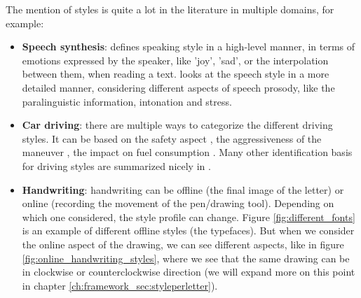   \par The mention of styles is quite a lot in the literature in multiple domains, for example:
  \begin{itemize}
    \item \textbf{Speech synthesis}: \citep{tachibana2004hmm} defines speaking style in a high-level manner, in terms of emotions expressed by the speaker, like 'joy', 'sad', or the interpolation between them, when reading a text. \citep{wang2018style} looks at the speech style in a more detailed manner, considering different aspects of speech prosody, like the paralinguistic information, intonation and stress.
    \item \textbf{Car driving}: there are multiple ways to categorize the different driving styles. It can be based on the safety aspect \citep{johnson2011driving}, the aggressiveness of the maneuver \citep{dorr2014online,xu2015establishing}, the impact on fuel consumption \citep{manzoni2010driving,neubauer2013accounting}. Many other identification basis for driving styles are summarized nicely in \citep{martinez2017driving}.
    \item \textbf{Handwriting}: handwriting can be offline (the final image of the letter) or online (recording the movement of the pen/drawing tool). Depending on which one considered, the style profile can change. Figure \ref{fig:different_fonts} is an example of different offline styles (the typefaces). But when we consider the online aspect of the drawing, we can see different aspects, like in figure \ref{fig:online_handwriting_styles}, where we see that the same drawing can be in clockwise or counterclockwise direction (we will expand more on this point in chapter \ref{ch:framework_sec:styleperletter}).
  \end{itemize}

